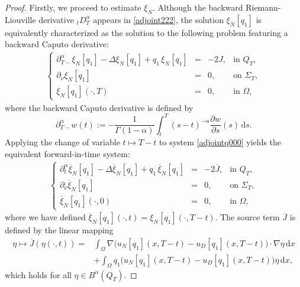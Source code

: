 \documentclass[a4paper,12pt,reqno,natbib]{amsart}
\begin{document}
{\begin{proof}
Firstly, we proceed to estimate $\xi_N$. Although the backward Riemann-Liouville derivative ${}_tD^{\alpha}_T$ appears in \eqref{adjoint222}, the solution $\xi_N[q_1]$ is equivalently characterized as the solution to the following problem featuring a backward Caputo derivative:
\begin{eqnarray}\label{adjointq000}
\left\{
  \begin{array}{rcll}
    \partial^\alpha_{T-}  \xi_N[q_1]-\Delta \xi_N[q_1] +q_1\, \xi_N[q_1] &=& -2J,  &\text{in } Q_T, \\
    \partial_\nu\xi_N[q_1]&=& 0,  &\text{on } \Sigma_T, \\
     \xi_N[q_1](\cdot,T)&=&0, &\text{in } \Omega,
  \end{array}
\right.
\end{eqnarray}
where the backward Caputo derivative is defined by
\[
\partial^\alpha_{T-}w(t) := -\frac{1}{\Gamma(1-\alpha)}\int_t^T (s-t)^{-\alpha} \frac{\partial w}{\partial s}(s) \, \mathrm{d}s.
\]
Applying the change of variable $t \mapsto T - t$ to system \eqref{adjointq000} yields the equivalent forward-in-time system:
\begin{eqnarray*}%
\left\{
  \begin{array}{rcll}
    \partial^\alpha_{t}  \overline{\xi}_N[q_1]-\Delta \overline{\xi}_N[q_1] +q_1\, \overline{\xi}_N[q_1] &=& -2\overline{J},  &\text{in } Q_T, \\
    \partial_\nu\overline{\xi}_N[q_1]&=& 0,  &\text{on } \Sigma_T, \\
    \overline{\xi}_N[q_1](\cdot,0)&=&0, &\text{in } \Omega,
  \end{array}
\right.
\end{eqnarray*}
where we have defined $\overline{\xi}_N[q_1](\cdot,t) = \xi_N[q_1](\cdot,T-t)$. The source term $\overline{J}$ is defined by the linear mapping
\begin{align*}
    \eta \longmapsto \overline{J}(\eta(\cdot,t)) =& \int_{\Omega} \nabla \Big(u_N[q_1](x,T-t)-u_D[q_1](x,T-t)\Big) \cdot \nabla \eta  \,\mathrm{d}x \\ &+ \int_{\Omega} q_1 \Big(u_N[q_1](x,T-t)-u_D[q_1](x,T-t)\Big)\eta  \,\mathrm{d}x,
\end{align*}
which holds for all $\eta \in B^\alpha(Q_T)$.


\end{proof}}
\end{document}
